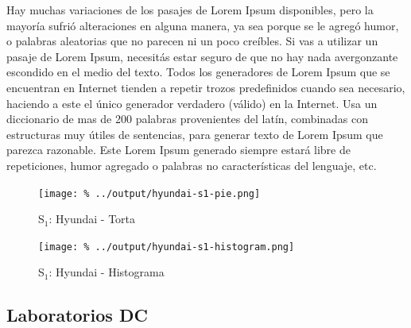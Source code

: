 \documentclass[final,inline,a4paper,narroweqnarray]{ieee}
\begin{document}
Hay muchas variaciones de los pasajes de Lorem Ipsum disponibles, pero la mayoría sufrió alteraciones en alguna manera, ya sea porque se le agregó humor, o palabras aleatorias que no parecen ni un poco creíbles. Si vas a utilizar un pasaje de Lorem Ipsum, necesitás estar seguro de que no hay nada avergonzante escondido en el medio del texto. Todos los generadores de Lorem Ipsum que se encuentran en Internet tienden a repetir trozos predefinidos cuando sea necesario, haciendo a este el único generador verdadero (válido) en la Internet. Usa un diccionario de mas de 200 palabras provenientes del latín, combinadas con estructuras muy útiles de sentencias, para generar texto de Lorem Ipsum que parezca razonable. Este Lorem Ipsum generado siempre estará libre de repeticiones, humor agregado o palabras no características del lenguaje, etc.

    \begin{figure}[ht]\begin{center}
      \texttt{[image: \%
      ../output/hyundai-s1-pie.png]}
      \vspace{-2em}
      \caption{S$_1$: Hyundai - Torta}
      \label{hyundai-s1-pie}
    \end{center}\end{figure}

    \begin{figure}[ht]\begin{center}
      \texttt{[image: \%
      ../output/hyundai-s1-histogram.png]}
      \vspace{-2em}
      \caption{S$_1$: Hyundai - Histograma}
      \label{hyundai-s1-histogram}
    \end{center}\end{figure}

  \subsection{Laboratorios DC}
\end{document}
